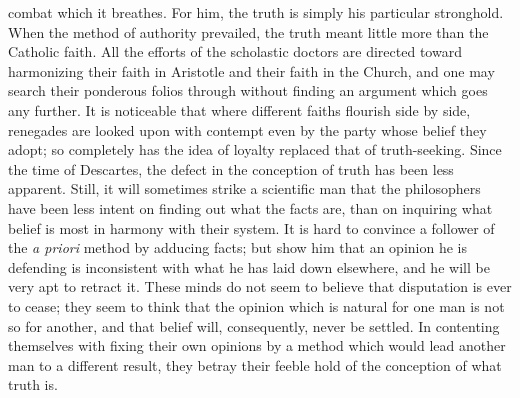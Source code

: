 \documentclass[]{article}
\begin{document}
combat which it breathes. For him, the truth is simply his particular stronghold. When the method of authority prevailed, the truth meant little more than the Catholic faith. All the efforts of the scholastic doctors are directed toward harmonizing their faith in Aristotle and their faith in the Church, and one may search their ponderous folios through without finding an argument which goes any further. It is noticeable that where different faiths flourish side by side, renegades are looked upon with contempt even by the party whose belief they adopt; so completely has the idea of loyalty replaced that of truth-seeking. Since the  time of Descartes, the defect in the conception of truth has been less apparent. Still, it will sometimes strike a scientific man that the philosophers have been less intent on finding out what the facts are, than on inquiring what belief is most in harmony with their system. It is hard to convince a follower of the \emph{a priori} method by adducing facts; but show him that an opinion he is defending is inconsistent with what he has laid down elsewhere, and he will be very apt to retract it. These minds do not seem to believe that disputation is ever to cease; they seem to think that the opinion which is natural for one man is not so for another, and that belief will, consequently, never be settled. In contenting themselves with fixing their own opinions by a method which would lead another man to a different result, they betray their feeble hold of the conception of what truth is. 
\end{document}
